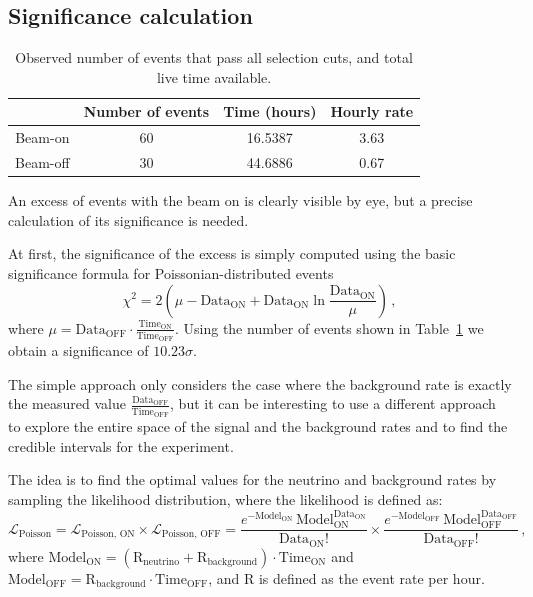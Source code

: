 \clearpage



\subsection{Significance calculation} \label{chap:significance_method}

\begin{table}[htbp]
    \centering
    \begin{tabular}{|c|c|c|c|}
        \hline
         & Number of events & Time (hours) & Hourly rate\\
        \hline
        Beam-on & 60 & 16.5387 & 3.63 \\
        \hline
        Beam-off & 30 & 44.6886 & 0.67\\
        \hline
    \end{tabular}
    \caption{Observed number of events that pass all selection cuts, and total live time available.}
    \label{tab:post_cut_numbers_all_tps}
\end{table}


An excess of events with the beam on is clearly visible by eye, but a precise calculation of its significance is needed.

At first, the significance of the excess is simply computed using the basic significance formula for Poissonian-distributed events
\begin{equation} \label{eq:basic_formula}
    \chi^2 = 2 \left(  \mu- \text{Data}_{\text{ON}} + \text{Data}_{\text{ON}} \ln \frac{\text{Data}_{\text{ON}}}{\mu}\right) \, ,
\end{equation}
where $\mu = \text{Data}_{\text{OFF}} \cdot \frac{\text{Time}_{\text{ON}}}{\text{Time}_{\text{OFF}}}$. 
Using the number of events shown in Table~\ref{tab:post_cut_numbers_all_tps} we obtain a significance of $10.23\sigma$.

The simple approach only considers the case where the background rate is exactly the measured value $\frac{\text{Data}_{\text{OFF}}}{\text{Time}_{\text{OFF}}}$, but it can be interesting to use a different approach to explore the entire space of the signal and the background rates and to find the credible intervals for the experiment. 

The idea is to find the optimal values for the neutrino and background rates by sampling the likelihood distribution, where the likelihood is defined as:
\begin{equation}\label{eq:likelihood}
    \mathcal{L}_{\text{Poisson}}
    = \mathcal{L}_{\text{Poisson, ON}} \times \mathcal{L}_{\text{Poisson, OFF}}
    = \frac{e^{-\text{Model}_{\text{ON}}}\,\text{Model}_{\text{ON}}^{\text{Data}_{\text{ON}}}}{\text{Data}_{\text{ON}}!}
      \times
      \frac{e^{-\text{Model}_{\text{OFF}}}\,\text{Model}_{\text{OFF}}^{\text{Data}_{\text{OFF}}}}{\text{Data}_{\text{OFF}}!}\,,
\end{equation}
where \(\text{Model}_{\text{ON}}=(\text{R}_{\text{neutrino}}+\text{R}_{\text{background}})\cdot \text{Time}_{\text{ON}}\) and \(\text{Model}_{\text{OFF}}=\text{R}_{\text{background}}\cdot \text{Time}_{\text{OFF}}\), and $\text{R}$ is defined as the event rate per hour.



